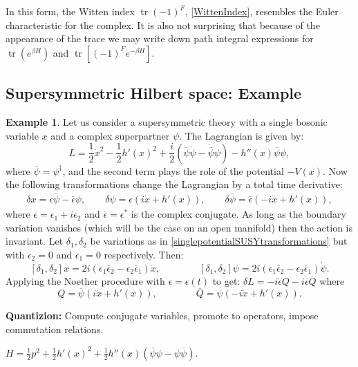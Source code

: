 \documentclass{report}
\theoremstyle{plain}
\theoremstyle{definition}
\newtheorem{example}[theorem]{Example}
\theoremstyle{remark}
\newcommand{\cnj}{\overline}
\newcommand{\FR}[2]{\frac{#1}{#2}}
\DeclareMathOperator{\Tr}{tr}
\begin{document}
In this form, the Witten index $\Tr(-1)^F$, \eqref{WittenIndex}, resembles
the Euler characteristic for the complex. It is also not surprising that
because of the appearance of the trace we may write down path integral
expressions for $\Tr(e^{\beta H})$ and $\Tr\left[ (-1)^Fe^{-\beta H}
\right]$. 
\subsection{Supersymmetric Hilbert space: Example} 

\begin{example} Let us consider a supersymmetric theory with a single bosonic
variable $x$ and a complex superpartner $\psi$. The Lagrangian is given by:
\[ L = \FR{1}{2} \dot x^2 - \FR{1}{2} h'(x)^2 + \FR{i}{2}\left( \cnj\psi
\dot\psi - \dot{\cnj\psi}\psi \right) - h''(x)\cnj\psi\psi,\]
where $\cnj\psi=\psi^\dagger$, and the second term plays the role of the
potential $-V(x)$. Now the following transformations change the Lagrangian
by a total time derivative:
\begin{align}
    \delta x = \epsilon\cnj\psi-\cnj\epsilon\psi,\qquad
    \delta \psi=\epsilon(i\dot x+h'(x)),\qquad
    \delta\cnj\psi=\cnj\epsilon(-i\dot x+h'(x)),
    \label{singlepotentialSUSYtransformations}
\end{align}
where $\epsilon=\epsilon_1+i\epsilon_2$ and $\cnj\epsilon=\epsilon^*$ is
the complex conjugate. As long as the boundary variation vanishes (which
will be the case on an open manifold) then the action is invariant. Let
$\delta_1,\delta_2$ be variations as in \eqref{singlepotentialSUSYtransformations}
but with $\epsilon_2=0$ and $\epsilon_1=0$ respectively. Then:
\[[\delta_1,\delta_2]x =2i(\epsilon_1\cnj\epsilon_2 -
\epsilon_2\cnj\epsilon_1)\dot x,\qquad\qquad [\delta_1,\delta_2]\psi
=2i(\epsilon_1\cnj\epsilon_2-\epsilon_2\cnj\epsilon_1)\dot\psi.\]
Applying the Noether procedure with $\epsilon=\epsilon(t)$ to get: $\delta
L = -i\dot\epsilon Q - i\dot{\cnj\epsilon}\cnj Q$ where
\[Q=\cnj\psi(i\dot x+h'(x)),\qquad\qquad\cnj Q = \psi(-i\dot x+h'(x)).\]

\textbf{Quantizion:} Compute conjugate variables, promote to operators,
impose commutation relations.

$H=\FR{1}{2}p^2+\FR{1}{2}h'(x)^2+\FR{1}{2}h''(x)(\cnj\psi\psi-\psi\cnj\psi)$.


\end{example}
\end{document}
